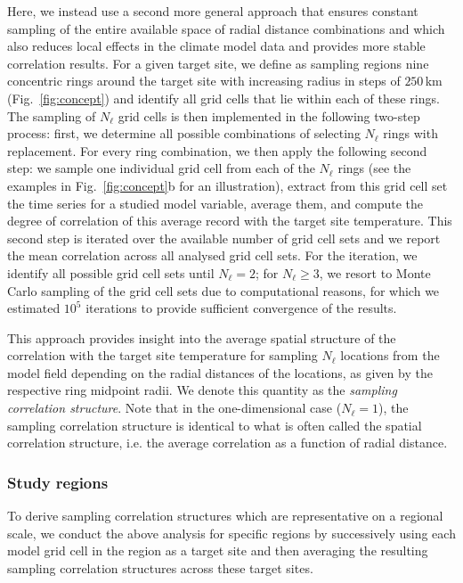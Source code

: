 \documentclass[cp]{copernicus}
\begin{document}
Here, we instead use a second more general approach that ensures constant
sampling of the entire available space of radial distance combinations and which
also reduces local effects in the climate model data and provides more stable
correlation results. For a given target site, we define as sampling regions nine
concentric rings around the target site with increasing radius in steps of
$250$\,km (Fig.~\ref{fig:concept}) and identify all grid cells that lie within
each of these rings. The sampling of $N_{\ell}$ grid cells is then implemented
in the following two-step process: first, we determine all possible combinations
of selecting $N_{\ell}$ rings with replacement. For every ring combination, we
then apply the following second step: we sample one individual grid cell from
each of the $N_{\ell}$ rings (see the examples in Fig.~\ref{fig:concept}b for an
illustration), extract from this grid cell set the time series for a studied
model variable, average them, and compute the degree of correlation of this
average record with the target site temperature. This second step is iterated
over the available number of grid cell sets and we report the mean correlation
across all analysed grid cell sets. For the iteration, we identify all possible
grid cell sets until $N_{\ell}=2$; for $N_{\ell}\geq3$, we resort to Monte Carlo
sampling of the grid cell sets due to computational reasons, for which we
estimated $10^5$ iterations to provide sufficient convergence of the results.

This approach provides insight into the average spatial structure of the
correlation with the target site temperature for sampling $N_{\ell}$ locations
from the model field depending on the radial distances of the locations, as
given by the respective ring midpoint radii. We denote this quantity as the
\emph{sampling correlation structure}. Note that in the one-dimensional case
($N_{\ell}=1$), the sampling correlation structure is identical to what is often
called the spatial correlation structure, i.e. the average correlation as a
function of radial distance.

\subsubsection{Study regions}\label{methods:regions}

To derive sampling correlation structures which are representative on a regional
scale, we conduct the above analysis for specific regions by successively using
each model grid cell in the region as a target site and then averaging the
resulting sampling correlation structures across these target sites.
\end{document}

